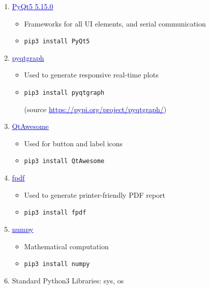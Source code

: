 \documentclass[11pt,fleqn]{book} %
\begin{document}
\begin{enumerate}
	\item \href{https://pypi.org/project/PyQt5/}{\textcolor{blue}{\underline{PyQt5 5.15.0}}}
	\begin{itemize}
		\item Frameworks for all UI elements, and serial communication
		\item \begin{verbatim}pip3 install PyQt5 \end{verbatim}
	\end{itemize}
	\item \href{https://pyqtgraph.readthedocs.io/en/latest/index.html}{\textcolor{blue}{\underline{pyqtgraph}}}
		\begin{itemize}
		\item Used to generate responsive real-time plots
		\item \begin{verbatim}pip3 install pyqtgraph \end{verbatim} (source \href{https://pypi.org/project/pyqtgraph/}{\textcolor{blue}{\underline{https://pypi.org/project/pyqtgraph/}}})
	\end{itemize}
	\item \href{https://pypi.org/project/QtAwesome/}{\textcolor{blue}{\underline{QtAwesome}}}
		\begin{itemize}
		\item Used for button and label icons
		\item \begin{verbatim}pip3 install QtAwesome \end{verbatim}
	\end{itemize}
	\item \href{https://pypi.org/project/fpdf/}{\textcolor{blue}{\underline{fpdf}}}
		\begin{itemize}
		\item Used to generate printer-friendly PDF report
		\item \begin{verbatim}pip3 install fpdf \end{verbatim}
	\end{itemize}
	\item \href{https://pypi.org/project/numpy/}{\textcolor{blue}{\underline{numpy}}}
		\begin{itemize}
			\item Mathematical computation
			\item \begin{verbatim}pip3 install numpy \end{verbatim}
		\end{itemize}
	\item Standard Python3 Libraries: sys, os
\end{enumerate}
\end{document}
